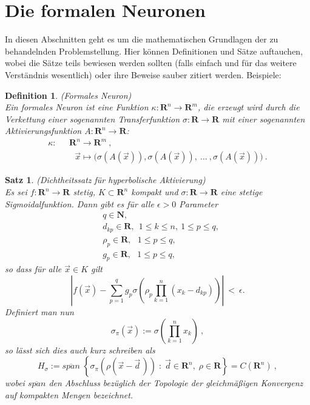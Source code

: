 \documentclass[12pt,twoside]{report}   %
\newtheorem{theo}{Satz}[section]
\newtheorem{defi}{Definition}[section]
\newcommand{\RR}{\mathbf{R}}
\newcommand{\NN}{\mathbf{N}}
\def\d{{\vec d}}
\def\x{{\vec x}}
\begin{document}
\section{Die formalen Neuronen}
In diesen Abschnitten geht es um die mathematischen Grundlagen der zu
behandelnden Problemstellung. Hier können Definitionen und Sätze
auftauchen, wobei die Sätze teils bewiesen werden sollten (falls einfach
und für das weitere Verständnis wesentlich) oder ihre Beweise sauber
zitiert werden. Beispiele: \\
\begin{defi}
{\rm (Formales Neuron)} \\
Ein formales Neuron ist eine Funktion
$\kappa: \RR^n \to \RR^m$, die erzeugt wird durch die Verkettung 
einer sogenannten {\sl Transferfunktion} 
$\sigma: \RR \to \RR$ mit einer sogenannten
{\sl Aktivierungsfunktion} $A: \RR^n \to \RR$:
\begin{equation}
\begin{array}{rl}
\kappa: \ \ \ & \RR^n \to \RR^m \ , \\
        & \ \ \ \vec x \mapsto 
        \big( \sigma(A(\vec x)), \sigma(A(\vec x)), \ \ldots \ ,
                               \sigma(A(\vec x)) \big) \ . 
\end{array} 
\end{equation}			       
\end{defi}

\begin{theo}
{\rm (Dichtheitssatz für hyperbolische Aktivierung)} \\
Es sei $f: \RR^n \to \RR$ stetig, $K \subset \RR^n$ kompakt
und $\sigma: \RR \to \RR$ eine stetige Sigmoidalfunktion.
Dann gibt es für alle $\epsilon > 0$ Parameter
\begin{equation}
\begin{array}{rl}
& q \in \NN, \\
& d_{kp} \in \RR, \ \ 1 \le k \le n , \ 1 \le p \le q , \\
& \rho_p \in \RR, \ \ \ 1 \le p \le q , \\
& g_p \in \RR, \ \ \ 1 \le p \le q , 
\end{array}\end{equation}
so dass für alle $\x \in K$ gilt
\begin{equation}
\left| f(\x ) - \sum_{p=1}^q g_p \sigma 
\left( \rho_p \prod\limits_{k=1}^n (x_k-d_{kp}) \right) \right| \ < \ \epsilon .
\end{equation}
Definiert man nun
\begin{equation}
\sigma_{\pi}(\x ) := \sigma(\prod_{k=1}^n x_k) \ ,
\end{equation}
so lässt sich dies auch kurz schreiben als
\begin{equation}
H_{\sigma}  :=	\overline{span} \; \left\{ \sigma_{\pi}(\rho ( \x - \d \, )) \; : \;
\d \in \RR^n, \; \rho \in \RR \right\}	=  C(\RR^n ) \ ,
\end{equation}
wobei $\overline{span}$ den Abschluss bezüglich der Topologie der
gleichmäßigen Konvergenz auf kompakten Mengen bezeichnet.
\end{theo}
\end{document}
